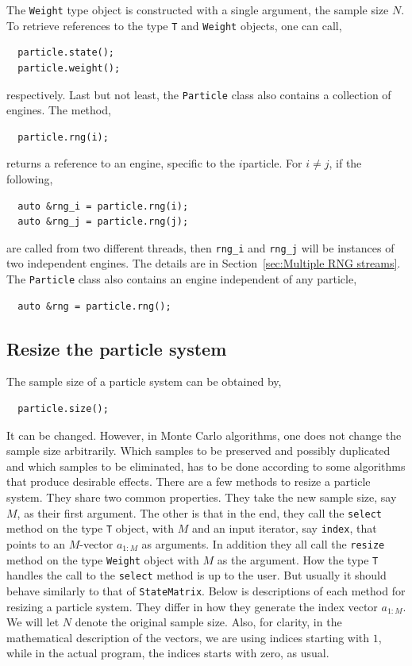 The \verb|Weight| type object is constructed with a single argument, the sample
size $N$. To retrieve references to the type \verb|T| and \verb|Weight|
objects, one can call,
\begin{Verbatim}
  particle.state();
  particle.weight();
\end{Verbatim}
respectively. Last but not least, the \verb|Particle| class also contains a
collection of \rng engines. The method,
\begin{Verbatim}
  particle.rng(i);
\end{Verbatim}
returns a reference to an \rng engine, specific to the $i$\ith particle. For $i
\ne j$, if the following,
\begin{Verbatim}
  auto &rng_i = particle.rng(i);
  auto &rng_j = particle.rng(j);
\end{Verbatim}
are called from two different threads, then \verb|rng_i| and \verb|rng_j| will
be instances of two independent \rng engines. The details are in
Section~\ref{sec:Multiple RNG streams}. The \verb|Particle| class also contains
an \rng engine independent of any particle,
\begin{Verbatim}
  auto &rng = particle.rng();
\end{Verbatim}

\subsection{Resize the particle system}
\label{sub:Resize the particle system}

The sample size of a particle system can be obtained by,
\begin{Verbatim}
  particle.size();
\end{Verbatim}
It can be changed. However, in Monte Carlo algorithms, one does not change the
sample size arbitrarily. Which samples to be preserved and possibly duplicated
and which samples to be eliminated, has to be done according to some algorithms
that produce desirable effects. There are a few methods to resize a particle
system. They share two common properties. They take the new sample size, say
$M$, as their first argument. The other is that in the end, they call the
\verb|select| method on the type \verb|T| object, with $M$ and an input
iterator, say \verb|index|, that points to an $M$-vector $a_{1:M}$ as
arguments. In addition they all call the \verb|resize| method on the type
\verb|Weight| object with $M$ as the argument. How the type \verb|T| handles
the call to the \verb|select| method is up to the user. But usually it should
behave similarly to that of \verb|StateMatrix|. Below is descriptions of each
method for resizing a particle system. They differ in how they generate the
index vector $a_{1:M}$. We will let $N$ denote the original sample size. Also,
for clarity, in the mathematical description of the vectors, we are using
indices starting with $1$, while in the actual program, the indices starts with
zero, as usual.

